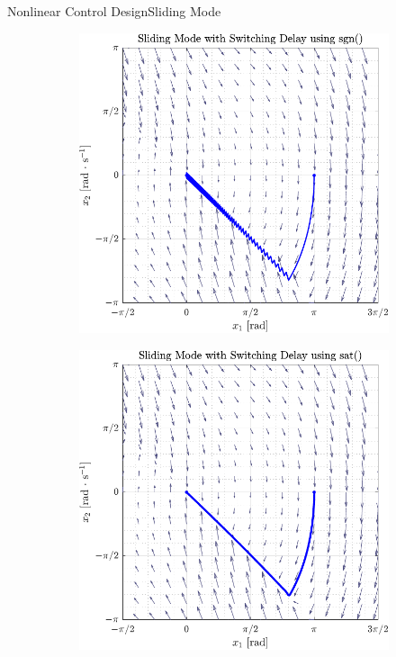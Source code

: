 \begin{frame}{Nonlinear Control Design}{Sliding Mode}
\begin{figure}[H]
  \begin{minipage}{0.45\linewidth}
    \begin{figure}[H]
      \centering
      \includegraphics[width=\linewidth]{figures/slidingModeSgn}
    \end{figure}        
  \end{minipage}\hfill      
  \begin{minipage}{0.45\linewidth}
    \begin{figure}[H]
      \centering
      \includegraphics[width=1\linewidth]{figures/slidingModeSat}

\end{figure}
\end{minipage}
\end{figure}
\end{frame}
